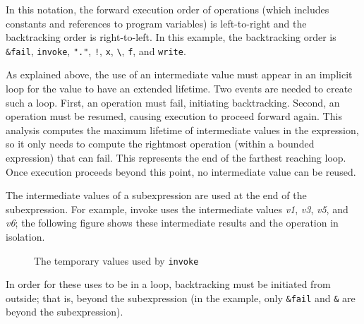 In this notation, the forward execution order of operations (which
includes constants and references to program variables) is
left-to-right and the backtracking order is right-to-left. In this
example, the backtracking order is \texttt{\&fail}, \texttt{invoke},
\texttt{"."}, \texttt{!}, \texttt{x}, \texttt{\textbackslash},
\texttt{f}, and \texttt{write}.

As explained above, the use of an intermediate value must appear in an
implicit loop for the value to have an extended lifetime. Two events
are needed to create such a loop. First, an operation must fail,
initiating backtracking. Second, an operation must be resumed, causing
execution to proceed forward again. This analysis computes the maximum
lifetime of intermediate values in the expression, so it only needs to
compute the rightmost operation (within a bounded expression) that can
fail. This represents the end of the farthest reaching loop. Once
execution proceeds beyond this point, no intermediate value can be
reused.

The intermediate values of a subexpression are used at the end of the
subexpression. For example, invoke uses the intermediate values
\textit{v1}, \textit{v3}, \textit{v5}, and \textit{v6}; the following
figure shows these intermediate results and the operation in
isolation.


\begin{figure}[htb]
\begin{center}
\end{center}
\caption{The temporary values used by \texttt{invoke}}
\end{figure}

In order for these uses to be in a loop, backtracking must be
initiated from outside; that is, beyond the subexpression (in the
example, only \texttt{\&fail} and \texttt{\&} are beyond the subexpression).

